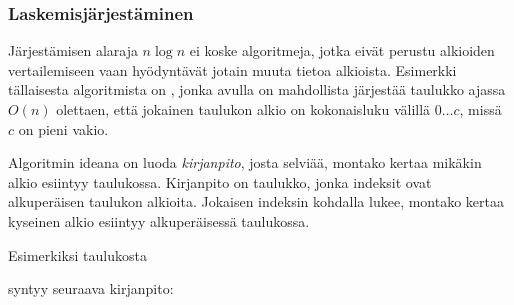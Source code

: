 \subsubsection{Laskemisjärjestäminen}


Järjestämisen alaraja $n \log n$ ei koske algoritmeja,
jotka eivät perustu alkioiden vertailemiseen
vaan hyödyntävät jotain muuta tietoa alkioista.
Esimerkki tällaisesta algoritmista on
, jonka avulla
on mahdollista järjestää
taulukko ajassa $O(n)$ olettaen,
että jokainen taulukon alkio on
kokonaisluku välillä $0 \ldots c$,
missä $c$ on pieni vakio.

Algoritmin ideana on luoda \emph{kirjanpito}, josta selviää,
montako kertaa mikäkin alkio esiintyy taulukossa.
Kirjanpito on taulukko, jonka indeksit ovat alkuperäisen
taulukon alkioita.
Jokaisen indeksin kohdalla lukee, montako kertaa
kyseinen alkio esiintyy alkuperäisessä taulukossa.

Esimerkiksi taulukosta
\begin{center}
\end{center}
syntyy seuraava kirjanpito:
\begin{center}
\end{center}

